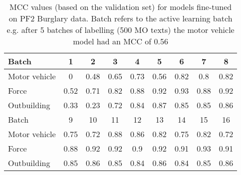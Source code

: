 \begin{table}[]
\centering
\begin{tabular}{@{}lcccccccc@{}}
\toprule
Batch       & 1    & 2    & 3    & 4    & 5    & 6    & 7    & 8    \\ \midrule
Motor vehicle          & 0    & 0.48 & 0.65 & 0.73 & 0.56 & 0.82 & 0.8  & 0.82 \\
Force       & 0.52 & 0.71 & 0.82 & 0.88 & 0.92 & 0.93 & 0.88 & 0.92 \\
Outbuilding & 0.33 & 0.23 & 0.72 & 0.84 & 0.87 & 0.85 & 0.85 & 0.86 \\\midrule
Batch       & 9    & 10   & 11   & 12   & 13   & 14   & 15   & 16   \\\midrule
Motor vehicle         & 0.75 & 0.72 & 0.88 & 0.86 & 0.82 & 0.75 & 0.82 & 0.72 \\
Force       & 0.88 & 0.92 & 0.92 & 0.9  & 0.92 & 0.91 & 0.93 & 0.91 \\
Outbuilding & 0.85 & 0.86 & 0.85 & 0.84 & 0.86 & 0.84 & 0.85 & 0.86 \\ \bottomrule
\end{tabular}
\caption[Batch metrics - PF2 data. All models]{\label{tab:results_1c}MCC values (based on the validation set) for models fine-tuned on PF2 Burglary data. Batch refers to the active learning batch e.g. after 5 batches of labelling (500 MO texts) the motor vehicle model had an MCC of 0.56 }
\end{table}



